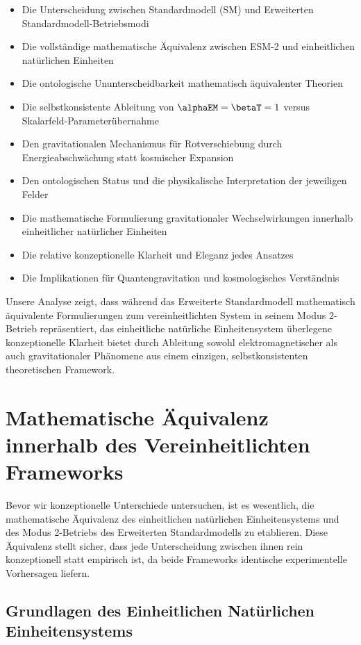 	\begin{itemize}
		\item Die Unterscheidung zwischen Standardmodell (SM) und Erweiterten Standardmodell-Betriebsmodi
		\item Die vollständige mathematische Äquivalenz zwischen ESM-2 und einheitlichen natürlichen Einheiten
		\item Die ontologische Ununterscheidbarkeit mathematisch äquivalenter Theorien
		\item Die selbstkonsistente Ableitung von $\alphaEM = \betaT = 1$ versus Skalarfeld-Parameterübernahme
		\item Den gravitationalen Mechanismus für Rotverschiebung durch Energieabschwächung statt kosmischer Expansion
		\item Den ontologischen Status und die physikalische Interpretation der jeweiligen Felder
		\item Die mathematische Formulierung gravitationaler Wechselwirkungen innerhalb einheitlicher natürlicher Einheiten
		\item Die relative konzeptionelle Klarheit und Eleganz jedes Ansatzes
		\item Die Implikationen für Quantengravitation und kosmologisches Verständnis
	\end{itemize}
	
	Unsere Analyse zeigt, dass während das Erweiterte Standardmodell mathematisch äquivalente Formulierungen zum vereinheitlichten System in seinem Modus 2-Betrieb repräsentiert, das einheitliche natürliche Einheitensystem überlegene konzeptionelle Klarheit bietet durch Ableitung sowohl elektromagnetischer als auch gravitationaler Phänomene aus einem einzigen, selbstkonsistenten theoretischen Framework.
	
	\section{Mathematische Äquivalenz innerhalb des Vereinheitlichten Frameworks}
	\label{sec:mathematical_equivalence}
	
	Bevor wir konzeptionelle Unterschiede untersuchen, ist es wesentlich, die mathematische Äquivalenz des einheitlichen natürlichen Einheitensystems und des Modus 2-Betriebs des Erweiterten Standardmodells zu etablieren. Diese Äquivalenz stellt sicher, dass jede Unterscheidung zwischen ihnen rein konzeptionell statt empirisch ist, da beide Frameworks identische experimentelle Vorhersagen liefern.
	
	\subsection{Grundlagen des Einheitlichen Natürlichen Einheitensystems}
	\label{subsec:unified_foundation}
	
